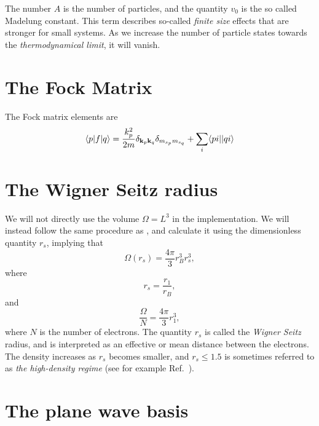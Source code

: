 The number $A$ is the number of particles, and the quantity
$v_0$ is the so called Madelung constant. This term describes so-called 
\emph{finite size} effects \cite{Baardsen2014} that are
stronger for small systems. As we increase the number of particle
states towards the \emph{thermodynamical limit}, it will vanish.

\section{The Fock Matrix}

The Fock matrix elements are \cite{Baardsen2014}
\begin{equation}
\langle p \vert f \vert q \rangle = \frac{k_p^2}{2m} \delta_{\bold{k}_p \bold{k}_q} \delta_{m_{s_p} m_{s_q}} + \sum_i  \langle pi \vert \vert qi \rangle 
\end{equation}

\FloatBarrier

\section{The Wigner Seitz radius}

We will not directly use the volume $\Omega = L^3$ in the
implementation. We will instead follow the same procedure as
\cite[p.105]{Baardsen2014}, and calculate it using the dimensionless
quantity $r_s$, implying that
\begin{equation}
\Omega(r_s) = \frac{4 \pi}{3} r_B^3 r_s^3,
\end{equation}
where
\begin{equation}
r_s = \frac{r_1}{r_B},
\end{equation}
and
\begin{equation}
\frac{\Omega}{N} = \frac{4\pi}{3} r_1^3,
\end{equation}
where $N$ is the number of electrons. The quantity $r_s$ is called the \emph{Wigner Seitz} radius, and is interpreted as an effective 
or mean distance between the electrons. The density increases as $r_s$ becomes smaller, and $r_s \leq 1.5$ is sometimes referred to as \emph{the high-density regime} (see for example Ref.~\cite{Shepherd2013}).

\section{The plane wave basis}

